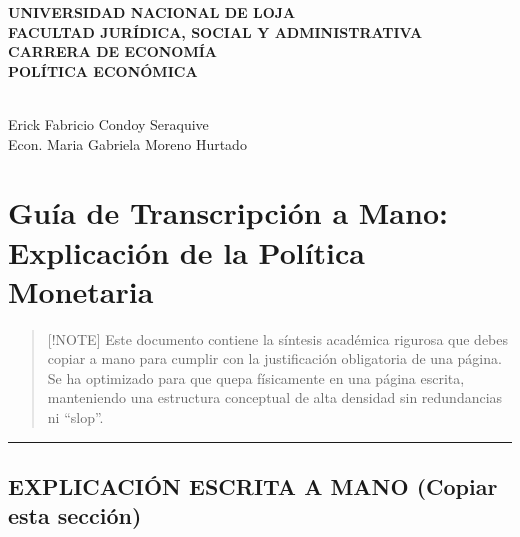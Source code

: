 \documentclass[12pt,spanish]{article}
\begin{document}
\begin{center}
    {\bfseries \Large UNIVERSIDAD NACIONAL DE LOJA}\\[0.3cm]
    {\bfseries \large FACULTAD JURÍDICA, SOCIAL Y
ADMINISTRATIVA}\\[0.2cm]
    {\bfseries CARRERA DE ECONOMÍA}\\[1.5cm]
    
    {\bfseries \large POLÍTICA ECONÓMICA}\\[1cm]
    
    {\bfseries \Large }\\[1.5cm]
\end{center}

\begin{center}
                        Erick Fabricio Condoy Seraquive \\
                \vspace{0.5cm}
    Econ. Maria Gabriela Moreno Hurtado \\ 
    
\end{center}

\vspace{1cm}

\doublespacing
\setlength{\parindent}{1.27cm}

\section{Guía de Transcripción a Mano: Explicación de la Política
Monetaria}\label{guuxeda-de-transcripciuxf3n-a-mano-explicaciuxf3n-de-la-poluxedtica-monetaria}

\begin{quote}
{[}!NOTE{]} Este documento contiene la síntesis académica rigurosa que
debes copiar a mano para cumplir con la justificación obligatoria de una
página. Se ha optimizado para que quepa físicamente en una página
escrita, manteniendo una estructura conceptual de alta densidad sin
redundancias ni ``slop''.
\end{quote}

\begin{center}\rule{0.5\linewidth}{0.5pt}\end{center}

\subsection{EXPLICACIÓN ESCRITA A MANO (Copiar esta
sección)}\label{explicaciuxf3n-escrita-a-mano-copiar-esta-secciuxf3n}
\end{document}
